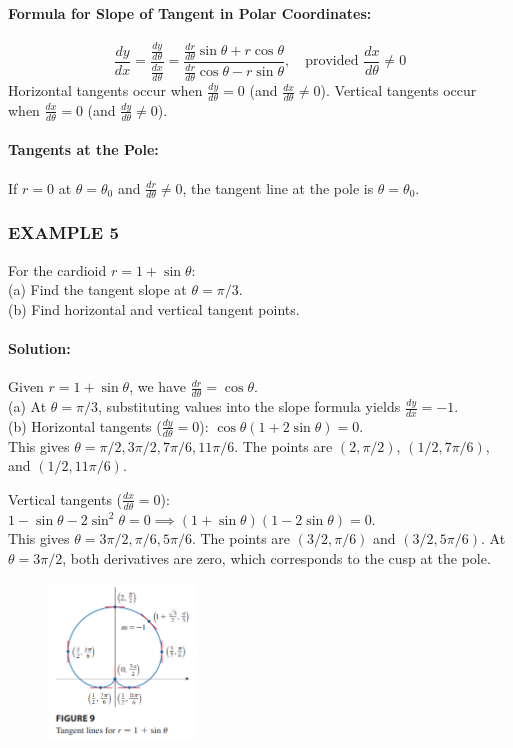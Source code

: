 \documentclass{article}
\begin{document}
\paragraph{Formula for Slope of Tangent in Polar Coordinates:}
\[
\frac{dy}{dx} = \frac{\frac{dy}{d\theta}}{\frac{dx}{d\theta}} = \frac{\frac{dr}{d\theta}\sin\theta + r\cos\theta}{\frac{dr}{d\theta}\cos\theta - r\sin\theta}, \quad \text{provided } \frac{dx}{d\theta} \neq 0
\]
Horizontal tangents occur when $\frac{dy}{d\theta} = 0$ (and $\frac{dx}{d\theta} \neq 0$). Vertical tangents occur when $\frac{dx}{d\theta} = 0$ (and $\frac{dy}{d\theta} \neq 0$).

\paragraph{Tangents at the Pole:} If $r = 0$ at $\theta = \theta_0$ and $\frac{dr}{d\theta} \neq 0$, the tangent line at the pole is $\theta = \theta_0$.

\subsubsection*{EXAMPLE 5}
For the cardioid $r = 1 + \sin\theta$: 
\\(a) Find the tangent slope at $\theta = \pi/3$. 
\\(b) Find horizontal and vertical tangent points.

\paragraph{Solution:} Given $r = 1 + \sin\theta$, we have $\frac{dr}{d\theta} = \cos\theta$.
\\(a) At $\theta = \pi/3$, substituting values into the slope formula yields $\frac{dy}{dx} = -1$.\\
(b) Horizontal tangents ($\frac{dy}{d\theta} = 0$): $\cos\theta(1 + 2\sin\theta) = 0$. 
\\This gives $\theta = \pi/2, 3\pi/2, 7\pi/6, 11\pi/6$. The points are $(2, \pi/2)$, $(1/2, 7\pi/6)$, and $(1/2, 11\pi/6)$.

Vertical tangents ($\frac{dx}{d\theta} = 0$): $1 - \sin\theta - 2\sin^2\theta = 0 \implies (1+\sin\theta)(1-2\sin\theta)=0$. 
\\This gives $\theta = 3\pi/2, \pi/6, 5\pi/6$. The points are $(3/2, \pi/6)$ and $(3/2, 5\pi/6)$. At $\theta=3\pi/2$, both derivatives are zero, which corresponds to the cusp at the pole.
\begin{figure}[htbp]
    \centering
    \includegraphics[width=0.35\textwidth]{graph49.png}
\end{figure}
\end{document}
